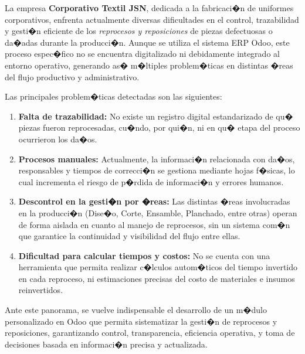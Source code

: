 \documentclass[12pt,letterpaper,spanish, xcolor=table]{report}
\begin{document}
La empresa \textbf{Corporativo Textil JSN}, dedicada a la fabricaci�n de uniformes corporativos, enfrenta actualmente diversas dificultades en el control, trazabilidad y gesti�n eficiente de los \textit{reprocesos y reposiciones} de piezas defectuosas o da�adas durante la producci�n. Aunque se utiliza el sistema ERP Odoo, este proceso espec�fico no se encuentra digitalizado ni debidamente integrado al entorno operativo, generando as� m�ltiples problem�ticas en distintas �reas del flujo productivo y administrativo.

Las principales problem�ticas detectadas son las siguientes:

\begin{enumerate}
    \item \textbf{Falta de trazabilidad:} No existe un registro digital estandarizado de qu� piezas fueron reprocesadas, cu�ndo, por qui�n, ni en qu� etapa del proceso ocurrieron los da�os.
    
    \item \textbf{Procesos manuales:} Actualmente, la informaci�n relacionada con da�os, responsables y tiempos de correcci�n se gestiona mediante hojas f�sicas, lo cual incrementa el riesgo de p�rdida de informaci�n y errores humanos.
    
    \item \textbf{Descontrol en la gesti�n por �reas:} Las distintas �reas involucradas en la producci�n (Dise�o, Corte, Ensamble, Planchado, entre otras) operan de forma aislada en cuanto al manejo de reprocesos, sin un sistema com�n que garantice la continuidad y visibilidad del flujo entre ellas.
    
    \item \textbf{Dificultad para calcular tiempos y costos:} No se cuenta con una herramienta que permita realizar c�lculos autom�ticos del tiempo invertido en cada reproceso, ni estimaciones precisas del costo de materiales e insumos reinvertidos.

\end{enumerate}

Ante este panorama, se vuelve indispensable el desarrollo de un m�dulo personalizado en Odoo que permita sistematizar la gesti�n de reprocesos y reposiciones, garantizando control, transparencia, eficiencia operativa, y toma de decisiones basada en informaci�n precisa y actualizada.



\end{document}
